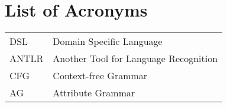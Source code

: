 \chapter*{List of Acronyms}

\begin{tabular}{ll}

DSL   & Domain Specific Language\\[0.1cm]
ANTLR & Another Tool for Language Recognition\\[0.1cm]
CFG   & Context-free Grammar\\[0.1cm]
AG    & Attribute Grammar\\[0.1cm]

\end{tabular}


